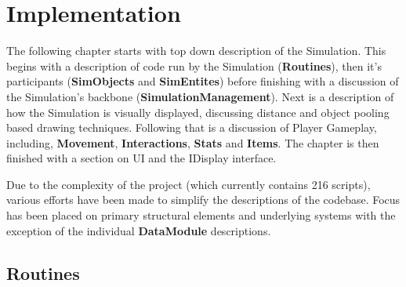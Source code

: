 \documentclass{report}
\begin{document}
\chapter{Implementation}

The following chapter starts with top down description of the Simulation. This begins with a description of code run by the Simulation (\textbf{Routines}), then it's participants (\textbf{SimObjects} and \textbf{SimEntites}) before finishing with a discussion of the Simulation's backbone (\textbf{SimulationManagement}). Next is a description of how the Simulation is visually displayed, discussing distance and object pooling based drawing techniques. Following that is a discussion of Player Gameplay, including, \textbf{Movement}, \textbf{Interactions}, \textbf{Stats} and \textbf{Items}. The chapter is then finished with a section on UI and the IDisplay interface. 

Due to the complexity of the project (which currently contains 216 scripts), various efforts have been made to simplify the descriptions of the codebase. Focus has been placed on primary structural elements and underlying systems with the exception of the individual \textbf{DataModule} descriptions.

\section{Routines}
\end{document}
